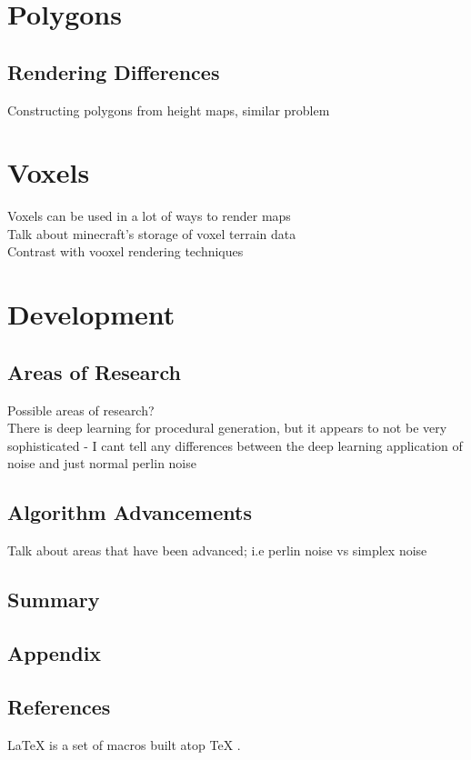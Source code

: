 \documentclass[12pt]{report}
\begin{document}
	\let\clearpage\relax
	\chapter{Polygons}
		\section{Rendering Differences }
		Constructing polygons from height maps, similar problem
		
		
		\section{}
	
	\chapter{Voxels}
		Voxels can be used in a lot of ways to render maps \\
		Talk about minecraft's storage of voxel terrain data \\
		Contrast with vooxel rendering techniques
	\chapter{Development}
		\section{Areas of Research}
		Possible areas of research? \\
		There is deep learning for procedural generation, but it appears to not be very sophisticated - I cant tell any differences between the deep learning application of noise and just normal perlin noise\\
		\section{Algorithm Advancements}
		Talk about areas that have been advanced; i.e perlin noise vs simplex noise 
	
	\section{Summary}
	\section{Appendix}
	\section{References}
	
	\LaTeX{} \cite{7522149} is a set of macros built atop \TeX{} \cite{7522149}.
		
		
	

	
\end{document}
